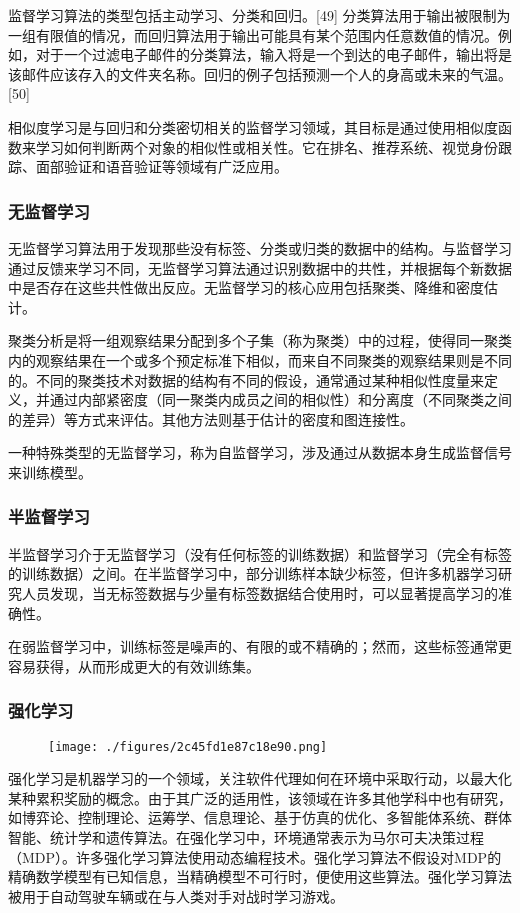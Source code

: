 监督学习算法的类型包括主动学习、分类和回归。[49] 分类算法用于输出被限制为一组有限值的情况，而回归算法用于输出可能具有某个范围内任意数值的情况。例如，对于一个过滤电子邮件的分类算法，输入将是一个到达的电子邮件，输出将是该邮件应该存入的文件夹名称。回归的例子包括预测一个人的身高或未来的气温。[50]

相似度学习是与回归和分类密切相关的监督学习领域，其目标是通过使用相似度函数来学习如何判断两个对象的相似性或相关性。它在排名、推荐系统、视觉身份跟踪、面部验证和语音验证等领域有广泛应用。
\subsubsection{无监督学习}  
无监督学习算法用于发现那些没有标签、分类或归类的数据中的结构。与监督学习通过反馈来学习不同，无监督学习算法通过识别数据中的共性，并根据每个新数据中是否存在这些共性做出反应。无监督学习的核心应用包括聚类、降维和密度估计。

聚类分析是将一组观察结果分配到多个子集（称为聚类）中的过程，使得同一聚类内的观察结果在一个或多个预定标准下相似，而来自不同聚类的观察结果则是不同的。不同的聚类技术对数据的结构有不同的假设，通常通过某种相似性度量来定义，并通过内部紧密度（同一聚类内成员之间的相似性）和分离度（不同聚类之间的差异）等方式来评估。其他方法则基于估计的密度和图连接性。

一种特殊类型的无监督学习，称为自监督学习，涉及通过从数据本身生成监督信号来训练模型。
\subsubsection{半监督学习}  
半监督学习介于无监督学习（没有任何标签的训练数据）和监督学习（完全有标签的训练数据）之间。在半监督学习中，部分训练样本缺少标签，但许多机器学习研究人员发现，当无标签数据与少量有标签数据结合使用时，可以显著提高学习的准确性。

在弱监督学习中，训练标签是噪声的、有限的或不精确的；然而，这些标签通常更容易获得，从而形成更大的有效训练集。
\subsubsection{强化学习}
\begin{figure}[ht]
\centering
\texttt{[image: ./figures/2c45fd1e87c18e90.png]}
\caption{} \label{fig_JQXX_4}
\end{figure}
强化学习是机器学习的一个领域，关注软件代理如何在环境中采取行动，以最大化某种累积奖励的概念。由于其广泛的适用性，该领域在许多其他学科中也有研究，如博弈论、控制理论、运筹学、信息理论、基于仿真的优化、多智能体系统、群体智能、统计学和遗传算法。在强化学习中，环境通常表示为马尔可夫决策过程（MDP）。许多强化学习算法使用动态编程技术。强化学习算法不假设对MDP的精确数学模型有已知信息，当精确模型不可行时，便使用这些算法。强化学习算法被用于自动驾驶车辆或在与人类对手对战时学习游戏。
